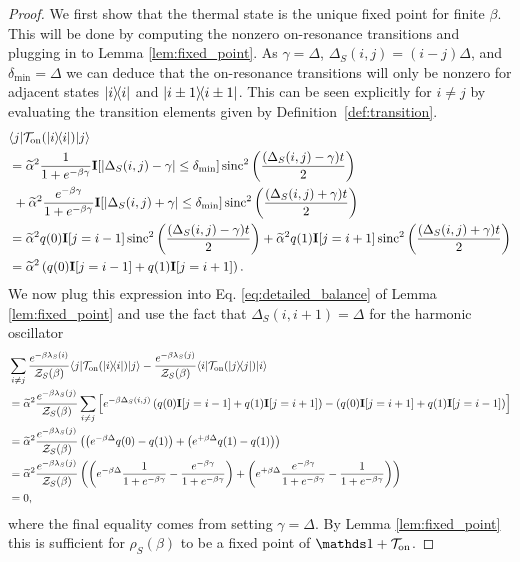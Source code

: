 \begin{proof}
    We first show that the thermal state is the unique fixed point for finite $\beta$. This will be done by computing the nonzero on-resonance transitions and plugging in to Lemma \ref{lem:fixed_point}. As $\gamma = \Delta$, $\Delta_S(i,j) = (i - j) \Delta$, and $\delta_{\min} = \Delta$ we can deduce that the on-resonance transitions will only be nonzero for adjacent states $| i\rangle\! \langle i|$ and $| i \pm 1\rangle\! \langle i \pm 1|$. This can be seen explicitly for $i \neq j$ by evaluating the transition elements given by Definition~\ref{def:transition}.
    \begin{align}
        &\langle j| \mathcal{T}_{\rm on}(| i\rangle\! \langle i|) |j\rangle \\
        &= \widetilde{\alpha}^2 \frac{1}{1 + e^{-\beta \gamma}} \mathbf{I}[|\Delta_S(i,j) - \gamma| \le \delta_{\min}]  \operatorname{sinc}^2\left(\frac{(\Delta_S(i,j) - \gamma)t}{2}\right) \nonumber \\
    &~+ \widetilde{\alpha}^2 \frac{e^{-\beta \gamma}}{1 + e^{-\beta \gamma}} \mathbf{I}[|\Delta_S(i,j) + \gamma| \le \delta_{\min}]  \operatorname{sinc}^2\left(\frac{(\Delta_S(i,j) + \gamma)t}{2}\right) \\
    &= \widetilde{\alpha}^2 q(0) \mathbf{I}[j = i - 1]  \operatorname{sinc}^2\left(\frac{(\Delta_S(i,j) - \gamma)t}{2}\right) + \widetilde{\alpha}^2 q(1) \mathbf{I}[j = i + 1]  \operatorname{sinc}^2\left(\frac{(\Delta_S(i,j) + \gamma)t}{2}\right) \\
    &= \widetilde{\alpha}^2 \left(q(0) \mathbf{I}[j = i - 1] +  q(1) \mathbf{I}[j = i + 1] \right). \label{eq:harmonic_oscillator_t_matrix}
    \end{align}
    We now plug this expression into Eq. \eqref{eq:detailed_balance} of Lemma \ref{lem:fixed_point} and use the fact that $\Delta_S(i,i+1)=\Delta$ for the harmonic oscillator
    \begin{align}
        &\sum_{i \neq j} \frac{e^{-\beta \lambda_S(i)}}{\mathcal{Z}_S(\beta)} \langle j| \mathcal{T}_{\rm on}(| i\rangle\! \langle i|) |j\rangle - \frac{e^{-\beta \lambda_S(j)}}{\mathcal{Z}_S(\beta)} \langle i| \mathcal{T}_{\rm on}(| j\rangle\! \langle j|) |i\rangle \\
        &= \widetilde{\alpha}^2 \frac{e^{-\beta \lambda_S(j)}}{\mathcal{Z}_S(\beta)} \sum_{i \neq j} \left[ e^{-\beta \Delta_S(i,j)} \left(q(0) \mathbf{I}[j = i - 1] +  q(1) \mathbf{I}[j = i + 1] \right) - \left(q(0) \mathbf{I}[j = i + 1] +  q(1) \mathbf{I}[j = i - 1] \right) \right] \\
        &= \widetilde{\alpha}^2 \frac{e^{-\beta \lambda_S(j)}}{\mathcal{Z}_S(\beta)} \left( \left(e^{-\beta \Delta} q(0) - q(1) \right) + \left(e^{+\beta \Delta} q(1) - q(1) \right)\right) \\
        &= \widetilde{\alpha}^2 \frac{e^{-\beta \lambda_S(j)}}{\mathcal{Z}_S(\beta)} \left( \left(e^{-\beta \Delta} \frac{1}{1 + e^{-\beta \gamma}} - \frac{e^{-\beta \gamma}}{1 + e^{-\beta \gamma}} \right) + \left(e^{+\beta \Delta} \frac{e^{-\beta \gamma}}{1 + e^{-\beta \gamma}} - \frac{1}{1 + e^{-\beta \gamma}} \right)\right) \\
        &= 0,
    \end{align}
    where the final equality comes from setting $\gamma = \Delta$. By Lemma \ref{lem:fixed_point} this is sufficient for $\rho_S(\beta)$ to be a fixed point of $\identity + \TT_{\on}$. 
    

\end{proof}
